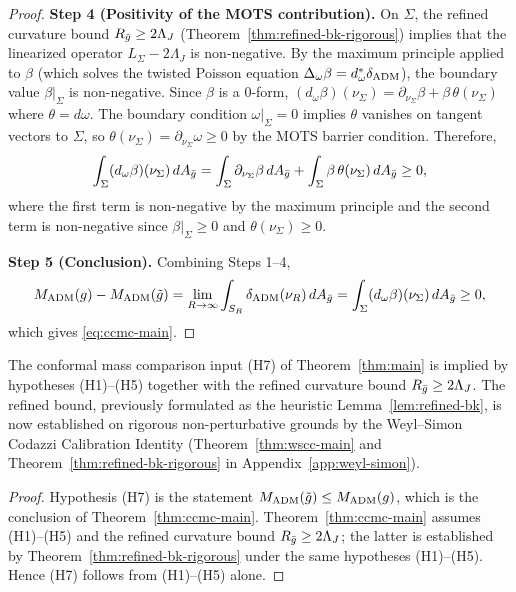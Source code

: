 \begin{proof}
\textbf{Step 4 (Positivity of the MOTS contribution).} On $\Sigma$, the refined curvature bound $R_{\bar{g}} \geq 2\Lambda_J$ (Theorem~\ref{thm:refined-bk-rigorous}) implies that the linearized operator $L_\Sigma - 2\Lambda_J$ is non-negative. By the maximum principle applied to $\beta$ (which solves the twisted Poisson equation $\Delta_{\omega} \beta = d^*_{\omega} \delta_{\mathrm{ADM}}$), the boundary value $\beta|_\Sigma$ is non-negative. Since $\beta$ is a $0$-form, $(d_{\omega}\beta)(\nu_\Sigma) = \partial_{\nu_\Sigma}\beta + \beta\,\theta(\nu_\Sigma)$ where $\theta = d\omega$. The boundary condition $\omega|_\Sigma = 0$ implies $\theta$ vanishes on tangent vectors to $\Sigma$, so $\theta(\nu_\Sigma) = \partial_{\nu_\Sigma}\omega \geq 0$ by the MOTS barrier condition. Therefore,
\begin{equation}
\int_{\Sigma} (d_{\omega}\beta)(\nu_\Sigma) \, dA_{\bar{g}} = \int_{\Sigma} \partial_{\nu_\Sigma} \beta \, dA_{\bar{g}} + \int_{\Sigma} \beta\,\theta(\nu_\Sigma) \, dA_{\bar{g}} \geq 0,
\end{equation}
where the first term is non-negative by the maximum principle and the second term is non-negative since $\beta|_\Sigma \geq 0$ and $\theta(\nu_\Sigma) \geq 0$.

\textbf{Step 5 (Conclusion).} Combining Steps 1--4,
\begin{equation}
M_{\mathrm{ADM}}(g) - M_{\mathrm{ADM}}(\tilde{g}) = \lim_{R \to \infty} \int_{S_R} \delta_{\mathrm{ADM}}(\nu_R) \, dA_{\bar{g}} = \int_{\Sigma} (d_{\omega}\beta)(\nu_\Sigma) \, dA_{\bar{g}} \geq 0,
\end{equation}
which gives \eqref{eq:ccmc-main}.
\end{proof}

\begin{corollary}\label{cor:remove-h7}
The conformal mass comparison input (H7) of Theorem~\ref{thm:main} is implied by hypotheses (H1)--(H5) together with the refined curvature bound $R_{\bar{g}} \geq 2\Lambda_J$. The refined bound, previously formulated as the heuristic Lemma~\ref{lem:refined-bk}, is now established on rigorous non-perturbative grounds by the Weyl--Simon Codazzi Calibration Identity (Theorem~\ref{thm:wscc-main} and Theorem~\ref{thm:refined-bk-rigorous} in Appendix~\ref{app:weyl-simon}).
\end{corollary}
\begin{proof}
Hypothesis (H7) is the statement $M_{\mathrm{ADM}}(\tilde{g})\leq M_{\mathrm{ADM}}(g)$, which is the conclusion of Theorem~\ref{thm:ccmc-main}. Theorem~\ref{thm:ccmc-main} assumes (H1)--(H5) and the refined curvature bound $R_{\bar{g}}\geq 2\Lambda_J$; the latter is established by Theorem~\ref{thm:refined-bk-rigorous} under the same hypotheses (H1)--(H5). Hence (H7) follows from (H1)--(H5) alone.
\end{proof}

